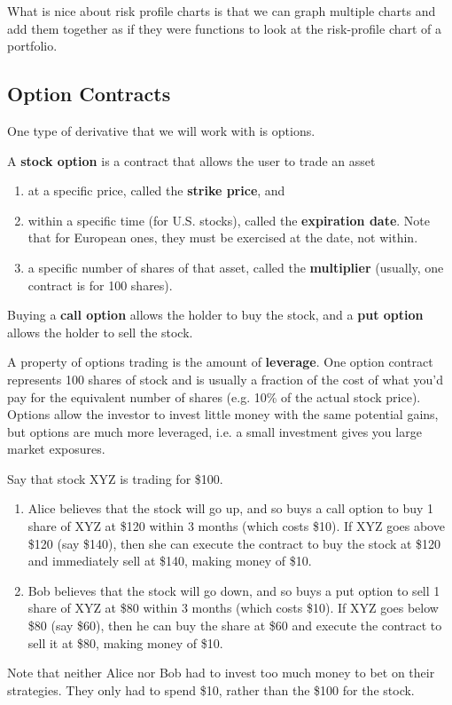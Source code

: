 \documentclass{article}
\begin{document}
What is nice about risk profile charts is that we can graph multiple charts and add them together as if they were functions to look at the risk-profile chart of a portfolio. 

\subsection{Option Contracts}

One type of derivative that we will work with is options. 

\begin{definition}
A \textbf{stock option} is a contract that allows the user to trade an asset 
\begin{enumerate}
    \item at a specific price, called the \textbf{strike price}, and 
    \item within a specific time (for U.S. stocks), called the \textbf{expiration date}. Note that for European ones, they must be exercised at the date, not within. 
    \item a specific number of shares of that asset, called the \textbf{multiplier} (usually, one contract is for 100 shares). 
\end{enumerate}
Buying a \textbf{call option} allows the holder to buy the stock, and a \textbf{put option} allows the holder to sell the stock. 
\end{definition}

A property of options trading is the amount of \textbf{leverage}. One option contract represents 100 shares of stock and is usually a fraction of the cost of what you'd pay for the equivalent number of shares (e.g. 10\% of the actual stock price). Options allow the investor to invest little money with the same potential gains, but options are much more leveraged, i.e. a small investment gives you large market exposures. 

\begin{example}
Say that stock XYZ is trading for \$100. 
\begin{enumerate}
    \item Alice believes that the stock will go up, and so buys a call option to buy 1 share of XYZ at \$120 within 3 months (which costs \$10). If XYZ goes above \$120 (say \$140), then she can execute the contract to buy the stock at \$120 and immediately sell at \$140, making money of \$10. 
    \item Bob believes that the stock will go down, and so buys a put option to sell 1 share of XYZ at \$80 within 3 months (which costs \$10). If XYZ goes below \$80 (say \$60), then he can buy the share at \$60 and execute the contract to sell it at \$80, making money of \$10. 
\end{enumerate}
Note that neither Alice nor Bob had to invest too much money to bet on their strategies. They only had to spend \$10, rather than the \$100 for the stock. 
\end{example}
\end{document}
